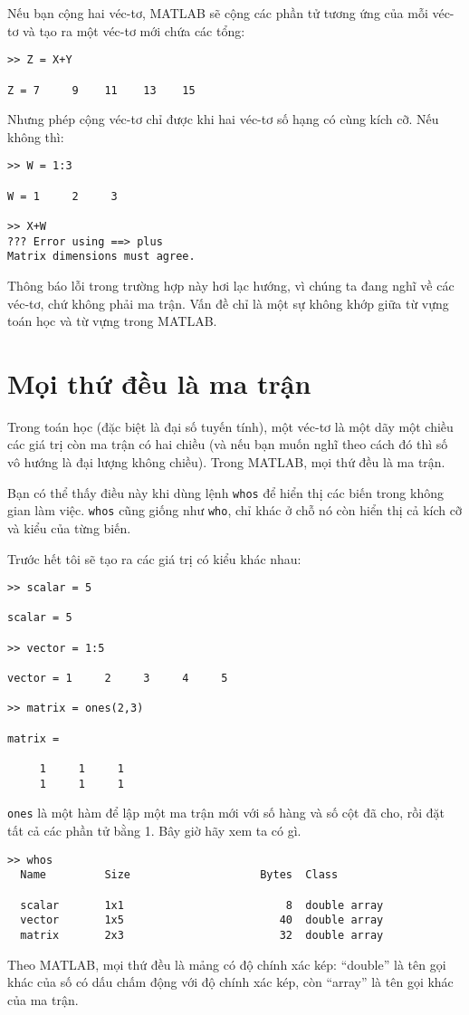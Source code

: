 \documentclass[12pt]{book}
\begin{document}
Nếu bạn cộng hai véc-tơ, MATLAB sẽ cộng các phần tử tương ứng
của mỗi véc-tơ và tạo ra một véc-tơ mới chứa các tổng:

\begin{verbatim}
>> Z = X+Y

Z = 7     9    11    13    15
\end{verbatim}
%
Nhưng phép cộng véc-tơ chỉ được khi hai véc-tơ số hạng có cùng
kích cỡ. Nếu không thì:

\begin{verbatim}
>> W = 1:3

W = 1     2     3

>> X+W
??? Error using ==> plus
Matrix dimensions must agree.
\end{verbatim}
%
Thông báo lỗi trong trường hợp này hơi lạc hướng, vì chúng ta đang
nghĩ về các véc-tơ, chứ không phải ma trận. Vấn đề chỉ là một sự
không khớp giữa từ vựng toán học và từ vựng trong MATLAB.



\section{Mọi thứ đều là ma trận}

Trong toán học (đặc biệt là đại số tuyến tính), một véc-tơ là một dãy
một chiều các giá trị còn ma trận có hai chiều (và nếu bạn muốn
nghĩ theo cách đó thì số vô hướng là đại lượng không chiều). 
Trong MATLAB, mọi thứ đều là ma trận.

Bạn có thể thấy điều này khi dùng lệnh {\tt whos} để hiển thị các
biến trong không gian làm việc.  {\tt whos} cũng giống như 
{\tt who}, chỉ khác ở chỗ nó còn hiển thị cả kích cỡ và kiểu của
từng biến.

Trước hết tôi sẽ tạo ra các giá trị có kiểu khác nhau:

\begin{verbatim}
>> scalar = 5

scalar = 5

>> vector = 1:5

vector = 1     2     3     4     5

>> matrix = ones(2,3)

matrix =

     1     1     1
     1     1     1
\end{verbatim}
%
{\tt ones} là một hàm để lập một ma trận mới với số hàng và
số cột đã cho, rồi đặt tất cả các phần tử bằng 1. Bây giờ hãy
xem ta có gì.

\begin{verbatim}
>> whos
  Name         Size                    Bytes  Class

  scalar       1x1                         8  double array
  vector       1x5                        40  double array
  matrix       2x3                        32  double array
\end{verbatim}
%
Theo MATLAB, mọi thứ đều là mảng có độ chính xác kép:  
``double'' là tên gọi khác của số có dấu chấm động với 
độ chính xác kép, còn ``array'' là tên gọi khác của ma trận.
\end{document}
